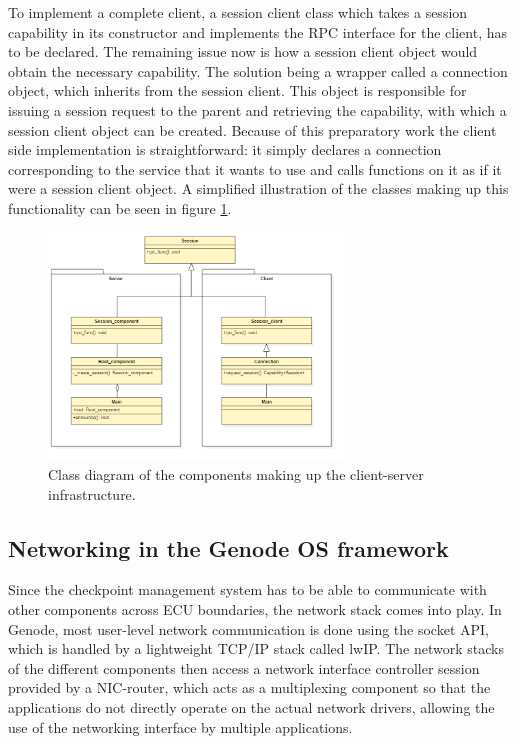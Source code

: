 To implement a complete client, a session client class which takes a session capability in its constructor and implements the RPC interface for the client, has to be declared. The remaining issue now is how a session client object would obtain the necessary capability. The solution being a wrapper called a connection object, which inherits from the session client. This object is responsible for issuing a session request to the parent and retrieving the capability, with which a session client object can be created. Because of this preparatory work the client side implementation is straightforward: it simply declares a connection corresponding to the service that it wants to use and calls functions on it as if it were a session client object. A simplified illustration of the classes making up this functionality can be seen in figure \ref{fig:client-server_classdiagram}. \cite{client-server_tutorial}
\begin{figure}
    \centering
    \includegraphics[width=0.7\textwidth]{Images/client-server_classdiagram.png}
    \caption{Class diagram of the components making up the client-server infrastructure.}
    \label{fig:client-server_classdiagram}
\end{figure}

\subsection{Networking in the Genode OS framework}\label{subsection:network}
Since the checkpoint management system has to be able to communicate with other components across ECU boundaries, the network stack comes into play. In Genode, most user-level network communication is done using the socket API, which is handled by a lightweight TCP/IP stack called lwIP. The network stacks of the different components then access a network interface controller session provided by a NIC-router, which acts as a multiplexing component so that the applications do not directly operate on the actual network drivers, allowing the use of the networking interface by multiple applications.

